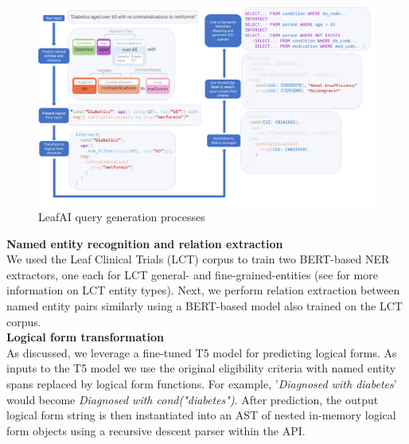 \documentclass[../main.tex]{subfiles}
\begin{document}
\begin{figure}[h]
  \includegraphics[scale=0.52]{Figures/Aim2/aim2_leafai_flow.pdf}  
\caption{LeafAI query generation processes}
\label{aim2_fig_leafai_querygen}
\end{figure}

\noindent \textbf{Named entity recognition and relation extraction} \\
We used the Leaf Clinical Trials (LCT) corpus \cite{dobbins2022leaf} to train two BERT-based \cite{devlin2018bert} NER extractors, one each for LCT general- and fine-grained-entities (see \cite{dobbins2022leaf} for more information on LCT entity types). Next, we perform relation extraction between named entity pairs similarly using a BERT-based model also trained on the LCT corpus. \\

\noindent \textbf{Logical form transformation} \\
As discussed, we leverage a fine-tuned T5 model for predicting logical forms. As inputs to the T5 model we use the original eligibility criteria with named entity spans replaced by logical form functions. For example, '\textit{Diagnosed with diabetes}' would become \textit{Diagnosed with cond("diabetes")}. After prediction, the output logical form string is then instantiated into an AST of nested in-memory logical form objects using a recursive descent parser within the API. \\
\end{document}
